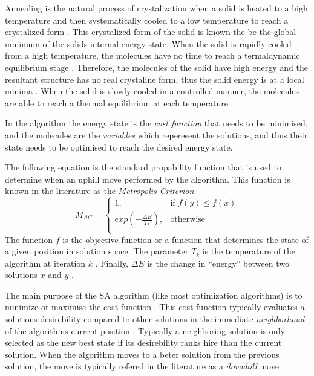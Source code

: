 Annealing is the natural process of crystalization when a solid is heated to a high temperature and then systematically cooled to a low temperature to reach a crystalized form \cite{CurveFittingSA,NewSAs,MobileRobotSA,ConstantTempSA}. This crystalized form of the solid is known the be the global minimum of the solids internal energy state. When the solid is rapidly cooled from a high temperature, the molecules have no time to reach a termaldynamic equilibrium stage \cite{CurveFittingSA,NewSAs,MobileRobotSA,ConstantTempSA}. Therefore, the molecules of the solid have high energy and the resultant structure has no real crystaline form, thus the solid energy is at a local minima \cite{CurveFittingSA,NewSAs,MobileRobotSA}. When the solid is slowly cooled in a controlled manner, the molecules are able to reach a thermal equilibrium at each temperature \cite{ChaosSA,CurveFittingSA,NewSAs,MobileRobotSA,ConstantTempSA}.

In the algorithm the energy state is the \emph{cost function} that needs to be minimised, and the molecules are the \emph{variables} which reperesent the solutions, and thus their state needs to be optimised to reach the desired energy state.

The following equation is the standard propability function that is used to determine when an uphill move performed by the algorithm. This function is known in the literature as the \emph{Metropolis Criterion}. 
\begin{equation}
	M_{AC} =
	\begin{cases}
	1, &\text{if $f(y) \leq f(x)$}\\
	exp(-\frac{\Delta E}{T_k}), &\text{otherwise}\\
	\end{cases}
\end{equation}
The function $f$ is the objective function or a function that determines the state of a given position in solution space\cite{EcoEquilSA}. The parameter $T_k$ is the temperature of the algorithm at iteration $k$ \cite{EcoEquilSA}. Finally, $\Delta E$ is the change in ``energy'' between two solutions $x$ and $y$ \cite{EcoEquilSA}.


The main purpose of the SA algorithm (like most optimization algorithms) is to minimize or maximise the cost function \cite{SASingleMultiObj}. This cost function typically evaluates a solutions desirebility compared to other solutions in the immediate \emph{neighborhoud} of the algorithms current position \cite{TheoPraticalSA}. Typically a neighboring solution is only selected as the new best state if its desirebility ranks hire than the current solution. When the algorithm moves to a beter solution from the previous solution, the move is typically refered in the literature as a \emph{downhill} move \cite{CurveFittingSA}.

